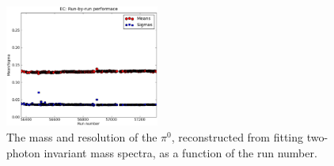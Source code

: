 \begin{figure}[h]
\begin{center}
 \includegraphics[width=0.45\textwidth]{figures/calib/ec/ec_pi0mass.eps}
  \caption{The mass and resolution of the $\pi^0$, reconstructed from fitting two-photon invariant mass spectra, as a function of the run number.}
  \label{ecpi0m}
  \end{center}
\end{figure}
%
%
%
%
\FloatBarrier
